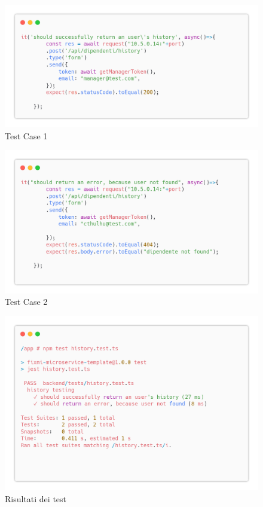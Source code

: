 \documentclass{report}
\begin{document}
\begin{figure}[H]
	\centering\includegraphics[width=1\textwidth]{images/microservizio-dipendenti/tests/history_test_1.png}
	\caption{Test Case 1}
\end{figure}
\begin{figure}[H]
	\centering\includegraphics[width=1\textwidth]{images/microservizio-dipendenti/tests/history_test_2.png}
	\caption{Test Case 2}
\end{figure}
\begin{figure}[H]
	\centering\includegraphics[width=1\textwidth]{images/microservizio-dipendenti/tests/history_test_results.png}
	\caption{Risultati dei test}
\end{figure}
\end{document}
